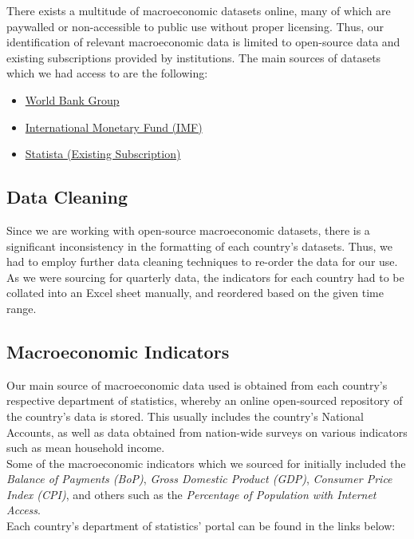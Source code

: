 \documentclass{article}
\begin{document}
\noindent There exists a multitude of macroeconomic datasets online, many of which are paywalled or non-accessible to public use without proper licensing. Thus, our identification of relevant macroeconomic data is limited to open-source data and existing subscriptions provided by institutions. The main sources of datasets which we had access to are the following:

\begin{itemize}
    \item \href{https://data.worldbank.org/}{World Bank Group} 
    \item \href{https://data.imf.org}{International Monetary Fund (IMF)}
    \item \href{https://statista.com}{Statista (Existing Subscription)}
\end{itemize} 

\subsection{Data Cleaning}
Since we are working with open-source macroeconomic datasets, there is a significant inconsistency in the formatting of each country's datasets. Thus, we had to employ further data cleaning techniques to re-order the data for our use. As we were sourcing for quarterly data, the indicators for each country had to be collated into an Excel sheet manually, and reordered based on the given time range.

\subsection{Macroeconomic Indicators}
Our main source of macroeconomic data used is obtained from each country's respective department of statistics, whereby an online open-sourced repository of the country's data is stored. This usually includes the country's National Accounts, as well as data obtained from nation-wide surveys on various indicators such as mean household income. \\

\noindent Some of the macroeconomic indicators which we sourced for initially included the \textit{Balance of Payments (BoP)}, \textit{Gross Domestic Product (GDP)}, \textit{Consumer Price Index (CPI)}, and others such as the \textit{Percentage of Population with Internet Access}. \\

\noindent Each country's department of statistics' portal can be found in the links below:
\end{document}
